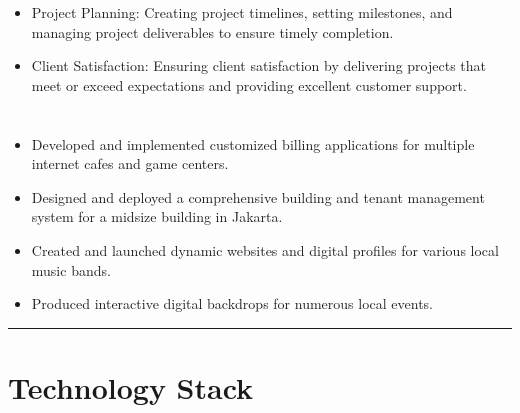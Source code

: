 \documentclass[12pt]{res}
\begin{document}
\begin{resume}
\begin{multicols}{2}
\begin{itemize}
\item Project Planning: Creating project timelines, setting milestones, and managing project deliverables to ensure timely completion.

\item Client Satisfaction: Ensuring client satisfaction by delivering projects that meet or exceed expectations and providing excellent customer support.
		\end{itemize}
	\section{}
		\begin{itemize}
			\setlength{\itemindent}{0pt}
			\item Developed and implemented customized billing applications for multiple internet cafes and game centers.

\item Designed and deployed a comprehensive building and tenant management system for a midsize building in Jakarta.

\item Created and launched dynamic websites and digital profiles for various local music bands.

\item Produced interactive digital backdrops for numerous local events.
		\end{itemize}
\end{multicols}

\vspace{-20pt}
\begin{minipage}[t]{0.55\linewidth}
	\rule{0.25\textwidth}{2pt}
	\begin{multicols}{2}
		\section{Technology Stack}
		\columnbreak
		\section{}
	\end{multicols}
	\vspace{1pt}
\end{minipage}
\hfill
\begin{minipage}[t]{0.42\linewidth}
	\vspace{18pt}

\end{minipage}
\end{resume}
\end{document}
